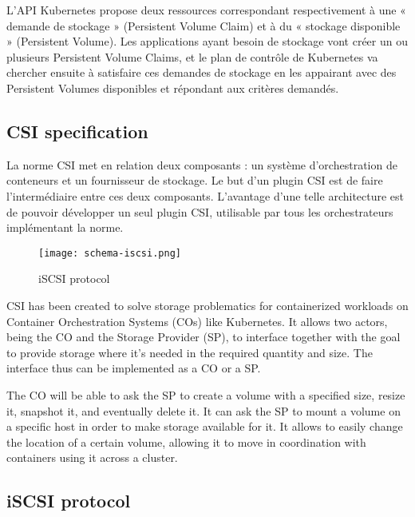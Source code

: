 \color{darkgreen}
L'API Kubernetes propose deux ressources correspondant respectivement à une « demande de stockage » (Persistent Volume Claim) et à du « stockage disponible » (Persistent Volume). Les applications ayant besoin de stockage vont créer un ou plusieurs Persistent Volume Claims, et le plan de contrôle de Kubernetes va chercher ensuite à satisfaire ces demandes de stockage en les appairant avec des Persistent Volumes disponibles et répondant aux critères demandés.
\color{black}

\subsection{CSI specification}

\color{darkgreen}
La norme CSI met en relation deux composants : un système d'orchestration de conteneurs et un fournisseur de stockage. Le but d'un plugin CSI est de faire l'intermédiaire entre ces deux composants. L'avantage d'une telle architecture est de pouvoir développer un seul plugin CSI, utilisable par tous les orchestrateurs implémentant la norme.

\begin{figure}[h]
    \centering
    \texttt{[image: schema-iscsi.png]}
    \caption{iSCSI protocol}
\end{figure}

CSI has been created to solve storage problematics for containerized workloads on Container Orchestration Systems (COs) like Kubernetes. It allows two actors, being the CO and the Storage Provider (SP), to interface together with the goal to provide storage where it's needed in the required quantity and size. The interface thus can be implemented as a CO or a SP.

The CO will be able to ask the SP to create a volume with a specified size, resize it, snapshot it, and eventually delete it. It can ask the SP to mount a volume on a specific host in order to make storage available for it. It allows to easily change the location of a certain volume, allowing it to move in coordination with containers using it across a cluster.
\color{black}

\subsection{iSCSI protocol}


